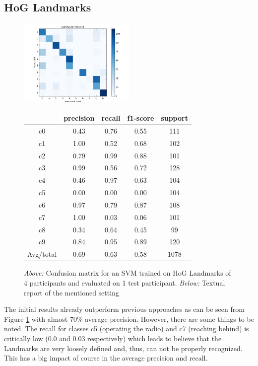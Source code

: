 \documentclass[10pt,twocolumn,letterpaper]{article}
\begin{document}
\subsection{HoG Landmarks}
\begin{figure}[h]
	\centering
	\includegraphics[width=0.5\textwidth]{mult_HOG/4c0123456789matComparable}
	\begin{tabular}{c||c|c|c|c}
		& precision&recall&f1-score&support\\	\hline
		c0&0.43&0.76&0.55&111\\
		c1&1.00&0.52&0.68&102\\
		c2&0.79&0.99&0.88&101\\
		c3&0.99&0.56&0.72&128\\
		c4&0.46&0.97&0.63&104\\
		c5&0.00&0.00&0.00&104\\
		c6&0.97&0.79&0.87&108\\
		c7&1.00&0.03&0.06&101\\
		c8&0.34&0.64&0.45&99\\
		c9&0.84&0.95&0.89&120\\ \hline
		Avg/total &0.69&0.63& 0.58 &1078
	\end{tabular}
	\caption{\textit{Above:} Confusion matrix for an SVM trained on HoG Landmarks of 4 participants and evaluated on 1 test participant. \textit{Below:} Textual report of the mentioned setting}
	\label{Landmarks_4all}
\end{figure}

The initial results already outperform previous approaches as can be seen from Figure \ref{Landmarks_4all}  with almost 70\% average precision. However, there are some things to be noted. The recall for classes c5 (operating the radio) and c7 (reaching behind) is critically low (0.0 and 0.03 respectively) which leads to believe that the Landmarks are very loosely defined and, thus, can not be properly recognized. This has a big impact of course in the average precision and recall. 
\end{document}
